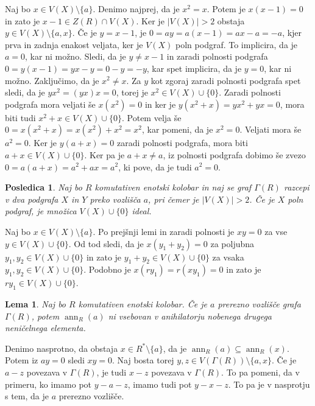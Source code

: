 \documentclass[a4paper, 12pt]{amsart}
\theoremstyle{definition} %
\theoremstyle{plain} %
\newtheorem{lema}[definicija]{Lema}
\newtheorem{posledica}[definicija]{Posledica}
\DeclareMathOperator{\ann}{ann}
\begin{document}
\proof
Naj bo $x\in V(X)\setminus \{a\}$. Denimo najprej, da je $x^2 = x$. Potem je $x(x-1) = 0$ in zato je $x-1\in Z(R) \cap V(X)$. Ker je $|V(X)|> 2$ obstaja $y\in V(X)\setminus \{a,x\}$. Če je $y = x-1$, je $0 = ay = a(x-1) = ax - a = -a$, kjer prva in zadnja enakost veljata, ker je $V(X)$ poln podgraf. To implicira, da je $a=0$, kar ni možno. Sledi, da je $y\neq x-1$ in zaradi polnosti podgrafa $0 = y(x-1) = yx-y = 0-y = -y$, kar spet implicira, da je $y=0$, kar ni možno. Zaključimo, da je $x^2 \neq x$. Za $y$ kot zgoraj zaradi polnosti podgrafa spet sledi, da je $yx^2 = (yx)x = 0$, torej je $x^2 \in V(X)\cup\{0\}$. Zaradi polnosti podgrafa mora veljati še $x(x^2)=0$ in ker je $y(x^2 + x ) = yx^2 + yx =0 $, mora biti tudi $x^2 + x\in V(X) \cup \{0\}$. Potem velja še  $0 = x(x^2 + x) = x(x^2) + x^2 = x^2$, kar pomeni, da je $x^2 = 0$. Veljati mora še $a^2 = 0$. Ker je $y(a+x) = 0 $ zaradi polnosti podgrafa, mora biti $a+x\in V(X) \cup\{0\}$. Ker pa je $a+x \neq a$, iz polnosti podgrafa dobimo še zvezo $0 = a(a+x) = a^2 + ax = a^2$, ki pove, da je tudi $a^2 = 0$.
\endproof

\begin{posledica}
Naj bo $R$ komutativen enotski kolobar in naj se graf $\Gamma(R)$ razcepi v dva podgrafa $X$ in $Y$ preko vozlišča $a$, pri čemer je $|V(X)|>2$. Če je $X$ poln podgraf, je množica $V(X)\cup \{0\}$ ideal.
\end{posledica}

\proof
Naj bo $x\in V(X)\setminus\{a\}$. Po prejšnji lemi in zaradi polnosti je $xy=0$ za vse $y\in V(X)\cup\{0\}$. Od tod sledi, da je $x(y_1 + y_2) = 0$ za poljubna $y_1,y_2 \in V(X)\cup \{0\}$ in zato je $y_1 + y_2 \in V(X) \cup\{0\}$ za vsaka $y_1,y_2\in V(X)\cup\{0\}$. Podobno je $x(ry_1) = r(xy_1 ) =0$ in zato je $ry_1\in V(X) \cup\{0\}$.
\endproof

\begin{lema}
\label{cutVertexMaxAnn}
Naj bo $R$ komutativen enotski kolobar. Če je $a$ prerezno vozlišče grafa $\Gamma(R)$, potem $\ann_R(a)$ ni vsebovan v anihilatorju nobenega drugega neničelnega elementa.
\end{lema}

\proof
Denimo nasprotno, da obstaja $x\in R^*\setminus\{a\}$, da je $\ann_R(a) \subseteq \ann_R(x)$. Potem iz $ay = 0$ sledi $xy = 0$. Naj bosta torej $y,z \in V(\Gamma(R)) \setminus \{a,x\}$. Če je $a-z$ povezava v $\Gamma(R)$, je tudi $x-z$ povezava v $\Gamma(R)$. To pa pomeni, da v primeru, ko imamo pot $y-a-z$, imamo tudi pot $y-x-z$. To pa je v nasprotju s tem, da je $a$ prerezno vozlišče.
\endproof
\end{document}
